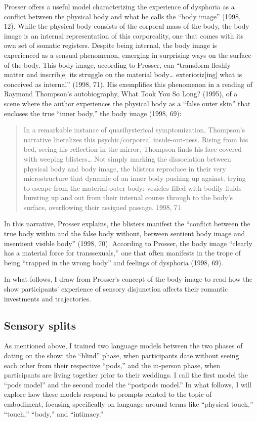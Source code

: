 \documentclass[11pt]{article}
\begin{document}
Prosser offers a useful model characterizing the experience of
dysphoria as a conflict between the physical body and what he calls
the “body image” (1998, 12). While the physical body consists of the
corporal mass of the body, the body image is an internal
representation of this corporeality, one that comes with its own set
of somatic registers. Despite being internal, the body image is
experienced as a sensual phenomenon, emerging in surprising ways on
the surface of the body. This body image, according to Prosser, can
“transform fleshly matter and inscrib[e] its struggle on the material
body… exterioriz[ing] what is conceived as internal” (1998, 71). His
exemplifies this phenomenon in a reading of Raymond Thompson’s
autobiography, What Took You So Long? (1995), of a scene where the
author experiences the physical body as a “false outer skin” that
encloses the true “inner body,” the body image (1998, 69):

\begin{quote}
In a remarkable instance of quasihysterical symptomization, Thompson’s
narrative literalizes this psychic/corporeal inside-out-ness. Rising
from his bed, seeing his reflection in the mirror, Thompson finds his
face covered with weeping blisters… Not simply marking the
dissociation between physical body and body image, the blisters
reproduce in their very microstructure that dynamic of an inner body
pushing up against, trying to escape from the material outer body:
vesicles filled with bodily fluids bursting up and out from their
internal course through to the body’s surface, overflowing their
assigned passage. 1998, 71
\end{quote}

In this narrative, Prosser explains, the blisters manifest the
“conflict between the true body within and the false body without,
between sentient body image and insentient visible body” (1998, 70).
According to Prosser, the body image “clearly has a material force for
transsexuals,” one that often manifests in the trope of being “trapped
in the wrong body” and feelings of dysphoria (1998, 69).

In what follows, I draw from Prosser’s concept of the body image to
read how the show participants’ experience of sensory disjunction
affects their romantic investments and trajectories.

\subsection{Sensory splits}
\label{sec:orgcfe9ce8}
As mentioned above, I trained two language models between the two
phases of dating on the show: the “blind” phase, when participants
date without seeing each other from their respective “pods,” and the
in-person phase, when participants are living together prior to their
weddings. I call the first model the “pods model” and the second model
the “postpods model.” In what follows, I will explore how these models
respond to prompts related to the topic of embodiment, focusing
specifically on language around terms like “physical touch,” “touch,”
“body,” and “intimacy.”
\end{document}
